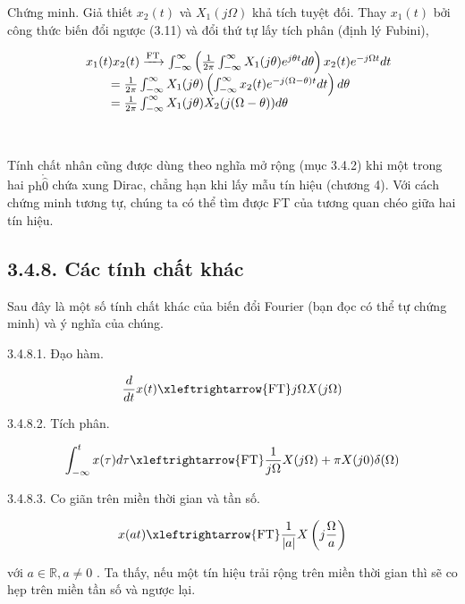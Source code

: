 \documentclass[
  10
]{article}
\begin{document}
Chứng minh. Giả thiết \(x _ { 2 } ( t )\) và \(X _ { 1 } ( j \Omega )\)
khả tích tuyệt đối. Thay \(x _ { 1 } ( t )\) bởi công thức biến đổi
ngược (3.11) và đổi thứ tự lấy tích phân (định lý Fubini),

\[
\begin{array}{r l} & x _ {1} (t) x _ {2} (t) \xrightarrow {\mathrm{FT}} \int_ {- \infty} ^ {\infty} \left(\frac {1}{2 \pi} \int_ {- \infty} ^ {\infty} X _ {1} (j \theta) e ^ {j \theta t} d \theta\right) x _ {2} (t) e ^ {- j \Omega t} d t \\ & \qquad = \frac {1}{2 \pi} \int_ {- \infty} ^ {\infty} X _ {1} (j \theta) \left(\int_ {- \infty} ^ {\infty} x _ {2} (t) e ^ {- j (\Omega - \theta) t} d t\right) d \theta \\ & \qquad = \frac {1}{2 \pi} \int_ {- \infty} ^ {\infty} X _ {1} (j \theta) X _ {2} (j (\Omega - \theta)) d \theta \end{array}
\]



Tính chất nhân cũng được dùng theo nghĩa mở rộng (mục 3.4.2) khi một
trong hai \(\mathrm { p h } \mathring { \hat { 0 } }\) chứa xung Dirac,
chẳng hạn khi lấy mẫu tín hiệu (chương 4). Với cách chứng minh tương tự,
chúng ta có thể tìm được FT của tương quan chéo giữa hai tín hiệu.

\subsection{3.4.8. Các tính chất
khác}\label{cuxe1c-tuxednh-chux1ea5t-khuxe1c}

Sau đây là một số tính chất khác của biến đổi Fourier (bạn đọc có thể tự
chứng minh) và ý nghĩa của chúng.

3.4.8.1. Đạo hàm.

\[
\frac {d}{d t} x (t) \xleftrightarrow {\mathrm{FT}} j \Omega X (j \Omega)
\]

3.4.8.2. Tích phân.

\[
\int_ {- \infty} ^ {t} x (\tau) d \tau \xleftrightarrow {\mathrm{FT}} \frac {1}{j \Omega} X (j \Omega) + \pi X (j 0) \delta (\Omega)
\]

3.4.8.3. Co giãn trên miền thời gian và tần số.

\[
x (a t) \xleftrightarrow {\mathrm{FT}} \frac {1}{| a |} X \left(j \frac {\Omega}{a}\right)
\]

với \(a \in \mathbb { R } , a \neq 0\) . Ta thấy, nếu một tín hiệu trải
rộng trên miền thời gian thì sẽ co hẹp trên miền tần số và ngược lại.
\end{document}
